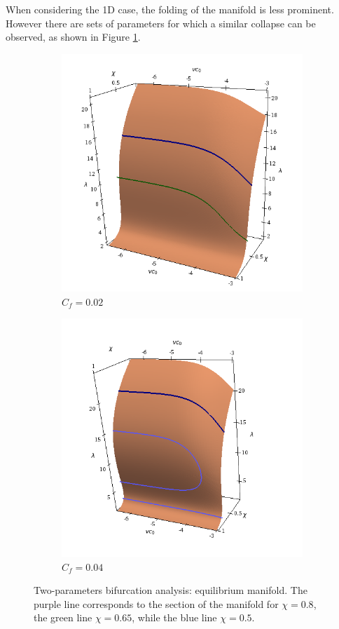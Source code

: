 When considering the 1D case, the folding of the manifold is less prominent. However there are sets of parameters for which a similar collapse can be observed, as shown in Figure \ref{manifold2}.
\begin{figure}[h]
	\begin{subfigure}{0.49\textwidth}
		\includegraphics[scale=0.4]{images/manifold1D_2}
		\caption{$C_f=0.02$}
	\end{subfigure}
\hspace{5mm}
	\begin{subfigure}{0.49\textwidth}
		\includegraphics[scale=0.45]{images/manifold1D_1}
		\caption{$C_f=0.04$}
	\end{subfigure}
	\caption{Two-parameters bifurcation analysis: equilibrium manifold. The purple line corresponds to the section of the manifold for $\chi=0.8$, the green line $\chi=0.65$, while the blue line $\chi=0.5$.}
	\label{manifold2}
\end{figure}
